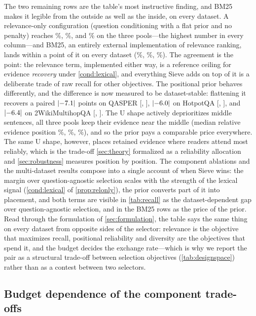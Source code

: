 \documentclass[preprint,12pt]{elsarticle}
\DeclarePairedDelimiter\abs{\lvert}{\rvert}
\theoremstyle{remark}
\newcommand{\method}{Sieve}
\begin{document}
The two remaining rows are the table's most instructive finding, and
BM25 makes it legible from the outside as well as the inside, on
every dataset. A relevance-only configuration (question conditioning
with a flat prior and no penalty) reaches \AblXQRelOnly\%,
\AblXHRelOnly\%, and \AblXWRelOnly\% on the three pools---the
highest number in every column---and BM25, an entirely external
implementation of relevance ranking, lands within a point of it on
every dataset (\AblXQBm\%, \AblXHBm\%, \AblXWBm\%). The agreement is
the point: the relevance term, implemented either way, is a reference
ceiling for evidence \emph{recovery} under \autoref{cond:lexical},
and everything \method{} adds on top of it is a deliberate trade of
raw recall for other objectives. The positional prior behaves
differently, and the difference is now measured to be dataset-stable:
flattening it recovers a paired $\abs{\AblPairQNoPos}$ points on QASPER
[\AblPairQNoPosLo, \AblPairQNoPosHi], $\abs{\AblPairHNoPos}$ on
HotpotQA [\AblPairHNoPosLo, \AblPairHNoPosHi], and
$\abs{\AblPairWNoPos}$ on 2WikiMultihopQA [\AblPairWNoPosLo,
\AblPairWNoPosHi]. The U shape actively deprioritizes middle
sentences, all three pools keep their evidence near the middle (median
relative evidence position \PoolQMedPos\%, \PoolHMedPos\%,
\PoolWMedPos\%), and so the prior pays a comparable price everywhere.
The same U shape, however, places retained evidence where readers
attend most reliably, which is the trade-off \autoref{sec:theory}
formalized as a reliability allocation and \autoref{sec:robustness}
measures position by position. The component ablations and the
multi-dataset results compose into a single account of when \method{}
wins: the margin over question-agnostic selection scales with the
strength of the lexical signal (\autoref{cond:lexical} of
\autoref{prop:relonly}), the prior converts part of it into placement,
and both terms are visible in \autoref{tab:recall} as the
dataset-dependent gap over question-agnostic selection, and in the
BM25 rows as the price of the prior. Read through the formulation of
\autoref{sec:formulation}, the table says the same thing on every
dataset from opposite sides of the selector: relevance is the
objective that maximizes recall, positional reliability and diversity
are the objectives that spend it, and the budget decides the exchange
rate---which is why we report the pair as a structural trade-off
between selection objectives (\autoref{tab:designspace}) rather than
as a contest between two selectors.

\subsection{Budget dependence of the component trade-offs}
\label{sec:matrix}
\end{document}
